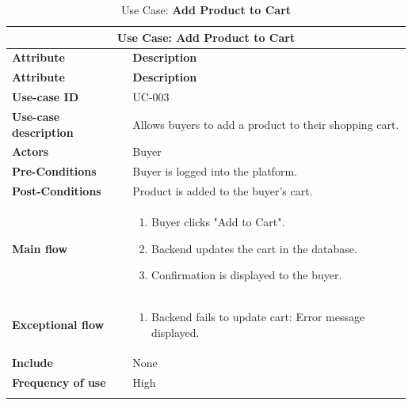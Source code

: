 \documentclass[12pt]{report}
\begin{document}
\begin{appendices}
	\begin{longtable}[H]{|l|p{9cm}||}
		\hline
		\multicolumn{2}{|c||}{\textbf{Use Case: Add Product to Cart}}                               \\
		\hline
		\textbf{Attribute}            & \textbf{Description}                                        \\
		\hline
		\endfirsthead
		\hline
		\textbf{Attribute}            & \textbf{Description}                                        \\
		\hline
		\endhead
		\textbf{Use-case ID}          & UC-003                                                      \\
		\hline
		\textbf{Use-case description} & Allows buyers to add a product to their shopping cart.      \\
		\hline
		\textbf{Actors}               & Buyer                                                       \\
		\hline
		\textbf{Pre-Conditions}       & Buyer is logged into the platform.                          \\
		\hline
		\textbf{Post-Conditions}      & Product is added to the buyer’s cart.                       \\
		\hline
		\textbf{Main flow}            & \begin{enumerate}
			                                \item Buyer clicks "Add to Cart".
			                                \item Backend updates the cart in the database.
			                                \item Confirmation is displayed to the buyer.
		                                \end{enumerate}              \\
		\hline
		\textbf{Exceptional flow}     & \begin{enumerate}
			                                \item Backend fails to update cart: Error message displayed.
		                                \end{enumerate} \\
		\hline
		\textbf{Include}              & None                                                        \\
		\hline
		\textbf{Frequency of use}     & High                                                        \\
		\hline
		\hline
		\caption{Use Case: \textbf{Add Product to Cart}}\label{tab:tableAddProduct}
	\end{longtable}


\end{appendices}
\end{document}
